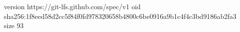 version https://git-lfs.github.com/spec/v1
oid sha256:1f8eed58d2cc5f84f0fd978320658b4800c6be0916a9b1c4f4c3bd9186ab2fa3
size 93
